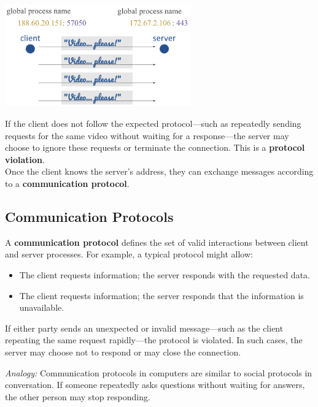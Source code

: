 \documentclass[../../compsys.tex]{subfiles}
\begin{document}
\vspace{0.5em}
\begin{center}
    \includegraphics[width=0.6\textwidth]{images/violating.png}
\end{center}
If the client does not follow the expected protocol—such as repeatedly sending requests for the same video without waiting for a response—the server may choose to ignore these requests or terminate the connection. This is a \textbf{protocol violation}.\\
Once the client knows the server's address, they can exchange messages according to a \textbf{communication protocol}.

\subsection{Communication Protocols}

A \textbf{communication protocol} defines the set of valid interactions between client and server processes. For example, a typical protocol might allow:

\begin{itemize}
    \item The client requests information; the server responds with the requested data.
    \item The client requests information; the server responds that the information is unavailable.
\end{itemize}

If either party sends an unexpected or invalid message—such as the client repeating the same request rapidly—the protocol is violated. In such cases, the server may choose not to respond or may close the connection.

\medskip

\noindent
\textit{Analogy:} Communication protocols in computers are similar to social protocols in conversation. If someone repeatedly asks questions without waiting for answers, the other person may stop responding.

\medskip
\end{document}

